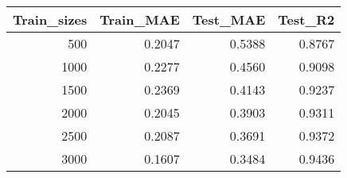 \begin{tabular}{rrrr}
\toprule
Train_sizes & Train_MAE & Test_MAE & Test_R2 \\
\midrule
500 & 0.2047 & 0.5388 & 0.8767 \\
1000 & 0.2277 & 0.4560 & 0.9098 \\
1500 & 0.2369 & 0.4143 & 0.9237 \\
2000 & 0.2045 & 0.3903 & 0.9311 \\
2500 & 0.2087 & 0.3691 & 0.9372 \\
3000 & 0.1607 & 0.3484 & 0.9436 \\
\bottomrule
\end{tabular}
